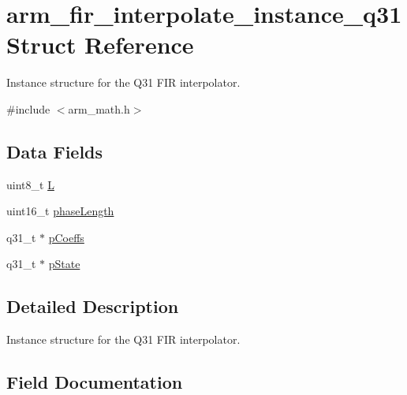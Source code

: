 \hypertarget{structarm__fir__interpolate__instance__q31}{}\section{arm\+\_\+fir\+\_\+interpolate\+\_\+instance\+\_\+q31 Struct Reference}
\label{structarm__fir__interpolate__instance__q31}


Instance structure for the Q31 F\+IR interpolator.  




{\ttfamily \#include $<$arm\+\_\+math.\+h$>$}

\subsection*{Data Fields}
\begin{DoxyCompactItemize}
\item 
uint8\+\_\+t \mbox{\hyperlink{structarm__fir__interpolate__instance__q31_aee73cc056696e504430c53eaa9c58cf0}{L}}
\item 
uint16\+\_\+t \mbox{\hyperlink{structarm__fir__interpolate__instance__q31_a8f92bb07e0812f94679438cdf412b26a}{phase\+Length}}
\item 
q31\+\_\+t $\ast$ \mbox{\hyperlink{structarm__fir__interpolate__instance__q31_a68888e36167d81cb7836db10367a1682}{p\+Coeffs}}
\item 
q31\+\_\+t $\ast$ \mbox{\hyperlink{structarm__fir__interpolate__instance__q31_adee4ba3ee8869865af7d8fa08ca913d6}{p\+State}}
\end{DoxyCompactItemize}


\subsection{Detailed Description}
Instance structure for the Q31 F\+IR interpolator. 

\subsection{Field Documentation}
\mbox{\label{structarm__fir__interpolate__instance__q31_aee73cc056696e504430c53eaa9c58cf0}} 
